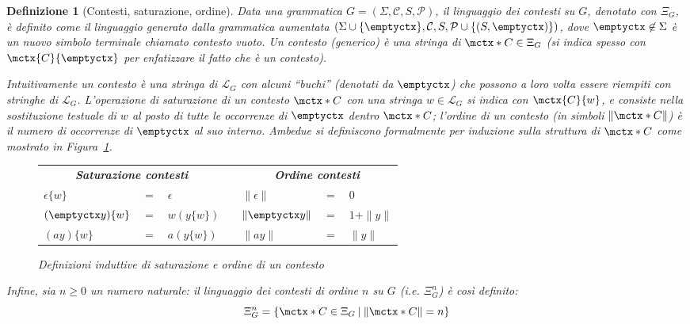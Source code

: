 \documentclass[12pt,a4paper,openright,twoside]{report}
\newtheorem{dfn}[thm]{Definizione}
\begin{document}
\begin{dfn}[Contesti, saturazione, ordine]
Data una grammatica $G = (\Sigma, \mathcal{C}, S, \mathcal{P})$, il \emph{linguaggio dei contesti su} $G$, denotato con $\Xi_G$, \`e definito come il linguaggio generato dalla grammatica aumentata $(\Sigma \cup \{ \emptyctx \}, \mathcal{C}, S, \mathcal{P} \cup \{ (S, \emptyctx) \})$, dove $\emptyctx \not\in \Sigma$ \`e un nuovo simbolo terminale chiamato \emph{contesto vuoto}. Un \emph{contesto (generico)} \`e una stringa di $\mctx*{C} \in \Xi_G$ (si indica spesso con $\mctx{C}{\emptyctx}$ per enfatizzare il fatto che \`e un contesto).

Intuitivamente un contesto \`e una stringa di $\mathscr{L}_G$ con alcuni ``buchi'' (denotati da $\emptyctx$) che possono a loro volta essere riempiti con stringhe di $\mathscr{L}_G$. L'operazione di \emph{saturazione di un contesto} $\mctx*{C}$ \emph{con una stringa} $w \in \mathscr{L}_G$ si indica con $\mctx{C}{w}$, e consiste nella sostituzione testuale di $w$ al posto di tutte le occorrenze di $\emptyctx$ dentro $\mctx*{C}$; l'\emph{ordine di un contesto} (in simboli $\| \mctx*{C} \|$) \`e il numero di occorrenze di $\emptyctx$ al suo interno. Ambedue si definiscono formalmente per induzione sulla struttura di $\mctx*{C}$ come mostrato in Figura~\ref{fig:satordctx}.

\begin{figure}
\begin{center}
\begin{tabular}{lclclcl}
	\multicolumn{3}{c}{\textbf{Saturazione contesti}} & \hspace{5em} & \multicolumn{3}{c}{\textbf{Ordine contesti}} \\
	$\epsilon\{w\}$ & $=$ & $\epsilon$ & & $\| \epsilon \|$ & $=$ & $0$ \\
	$(\emptyctx y)\{w\}$ & $=$ & $w (y\{w\})$ & & $\| \emptyctx y \|$ & $=$ & $1 + \| y \|$ \\
	$(a y)\{w\}$ & $=$ & $a (y\{w\})$ & & $\| a y \|$ & $=$ & $\| y \|$
\end{tabular}
\end{center}
\caption{Definizioni induttive di \emph{saturazione} e \emph{ordine} di un contesto}
\label{fig:satordctx}
\end{figure}

Infine, sia $n \ge 0$ un numero naturale: il \emph{linguaggio dei contesti di ordine} $n$ \emph{su} $G$ (i.e. $\Xi_G^n$) \`e cos\`i definito:
$$
	\Xi_G^n = \{ \mctx*{C} \in \Xi_G \:|\: \| \mctx*{C} \| = n \}
$$
\end{dfn}
\end{document}
